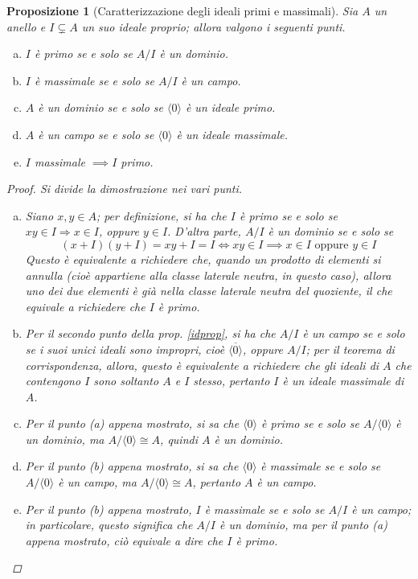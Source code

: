 \documentclass[12pt]{scrartcl}
\theoremstyle{style}
\newtheorem{prop}{Proposizione}[section]
\numberwithin{equation}{subsection}
\begin{document}
\begin{prop}
	[Caratterizzazione degli ideali primi e massimali]
\label{idprmaxchar}
	Sia $A$ un anello e $I\subsetneq A$ un suo ideale proprio; allora valgono i seguenti punti.
	\begin{enumerate}[(a).]
		\item $I$ \`e primo se e solo se $A / I$ \`e un dominio.
		\item $I$ \`e massimale se e solo se $A / I$ \`e un campo.
		\item $A$ \`e un dominio se e solo se $\langle 0 \rangle$ \`e un ideale primo.
		\item $A$ \`e un campo se e solo se $\langle 0 \rangle$ \`e un ideale massimale.
		\item $I$ massimale $\implies I$ primo.
	\end{enumerate}
	\begin{proof}
		Si divide la dimostrazione nei vari punti.
		\begin{enumerate}[(a).]
			\item Siano $x,y \in A$; per definizione, si ha che $I$ \`e primo se e solo se $xy \in I\Rightarrow x \in I$, oppure $y \in I$.
				D'altra parte, $A / I $ \`e un dominio se e solo se 
				\[
					(x+I)(y+I) = xy + I = I \iff xy \in I \implies x \in I \text{ oppure }y\in I
				\] 
				Questo \`e equivalente a richiedere che, quando un prodotto di elementi si annulla (cio\`e appartiene alla classe laterale neutra, in questo caso), allora uno dei due elementi \`e gi\`a nella classe laterale neutra del quoziente, il che equivale a richiedere che $I$ \`e primo.
			\item Per il secondo punto della prop. \ref{idprop}, si ha che $A / I $ \`e un campo se e solo se i suoi unici ideali sono impropri, cio\`e $\overline{\langle 0 \rangle}$, oppure $A / I$; per il teorema di corrispondenza, allora, questo \`e equivalente a richiedere che gli ideali di $A$ che contengono $I$ sono soltanto $A$ e $I$ stesso, pertanto $I$ \`e un ideale massimale di $A$.
			\item Per il punto (a) appena mostrato, si sa che $\langle 0 \rangle$ \`e primo se e solo se $A / \langle 0 \rangle$ \`e un dominio, ma $A / \langle 0 \rangle\cong A$, quindi $A$ \`e un dominio.
			\item Per il punto (b) appena mostrato, si sa che $\langle 0 \rangle$ \`e massimale se e solo se $A / \langle 0 \rangle$ \`e un campo, ma $A / \langle 0 \rangle\cong A$, pertanto $A$ \`e un campo.
			\item Per il punto (b) appena mostrato, $I$ \`e massimale se e solo se $A / I$ \`e un campo; in particolare, questo significa che $A / I$ \`e un dominio, ma per il punto (a) appena mostrato, ci\`o equivale a dire che $I$ \`e primo.
		\end{enumerate}
	\end{proof}
\end{prop}
\end{document}
